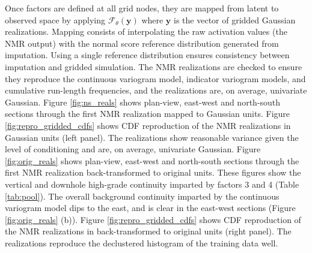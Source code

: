Once factors are defined at all grid nodes, they are mapped from latent to observed space by applying $\mathcal{F}_{\theta}(\mathbf{y})$ where $\mathbf{y}$ is the vector of gridded Gaussian realizations. Mapping consists of interpolating the raw activation values (the \gls{NMR} output) with the normal score reference distribution generated from imputation. Using a single reference distribution ensures consistency between imputation and gridded simulation. The \gls{NMR} realizations are checked to ensure they reproduce the continuous variogram model, indicator variogram models, and cumulative run-length frequencies, and the realizations are, on average, univariate Gaussian. Figure \ref{fig:ns_reals} shows plan-view, east-west and north-south sections through the first \gls{NMR} realization mapped to Gaussian units. Figure \ref{fig:repro_gridded_cdfs} shows \gls{CDF} reproduction of the \gls{NMR} realizations in Gaussian units (left panel). The realizations show reasonable variance given the level of conditioning and are, on average, univariate Gaussian. Figure \ref{fig:orig_reals} shows plan-view, east-west and north-south sections through the first \gls{NMR} realization back-transformed to original units. These figures show the vertical and downhole high-grade continuity imparted by factors 3 and 4 (Table \ref{tab:pool}). The overall background continuity imparted by the continuous variogram model dips to the east, and is clear in the east-west sections (Figure \ref{fig:orig_reals} (b)). Figure \ref{fig:repro_gridded_cdfs} shows \gls{CDF} reproduction of the \gls{NMR} realizations in back-transformed to original units (right panel). The realizations reproduce the declustered histogram of the training data well.


